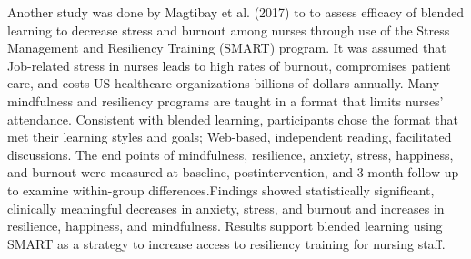 \documentclass[12pt]{article}
\begin{document}
Another study was done by Magtibay et al. (2017) to to assess efficacy of blended learning to decrease stress and burnout among nurses through use of the Stress Management and Resiliency Training (SMART) program. It was assumed that Job-related stress in nurses leads to high rates of burnout, compromises patient care, and costs US healthcare organizations billions of dollars annually. Many mindfulness and resiliency programs are taught in a format that limits nurses’ attendance. Consistent with blended learning, participants chose the format that met their learning styles and goals; Web-based, independent reading, facilitated discussions. The end points of mindfulness, resilience, anxiety, stress, happiness, and burnout were measured at baseline, postintervention, and 3-month follow-up to examine within-group differences.Findings showed statistically significant, clinically meaningful decreases in anxiety, stress, and burnout and increases in resilience, happiness, and mindfulness. Results support blended learning using SMART as a strategy to increase access to resiliency training for nursing staff.
\end{document}
